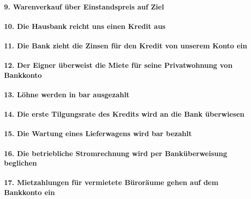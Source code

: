 \documentclass[paper=a4, fontsize=11pt]{scrartcl}
\numberwithin{equation}{section}
\numberwithin{figure}{section}
\numberwithin{table}{section}
\begin{document}
\paragraph{9. Warenverkauf über Einstandspreis auf Ziel}

\paragraph{10. Die Hausbank reicht uns einen Kredit aus}

\paragraph{11. Die Bank zieht die Zinsen für den Kredit von unserem Konto ein}

\paragraph{12. Der Eigner überweist die Miete für seine Privatwohnung von Bankkonto}

\paragraph{13. Löhne werden in bar ausgezahlt}

\paragraph{14. Die erste Tilgungsrate des Kredits wird an die Bank überwiesen}

\paragraph{15. Die Wartung eines Lieferwagens wird bar bezahlt}

\paragraph{16. Die betriebliche Stromrechnung wird per Banküberweisung beglichen}

\paragraph{17. Mietzahlungen für vermietete Büroräume gehen auf dem Bankkonto ein}
\end{document}
